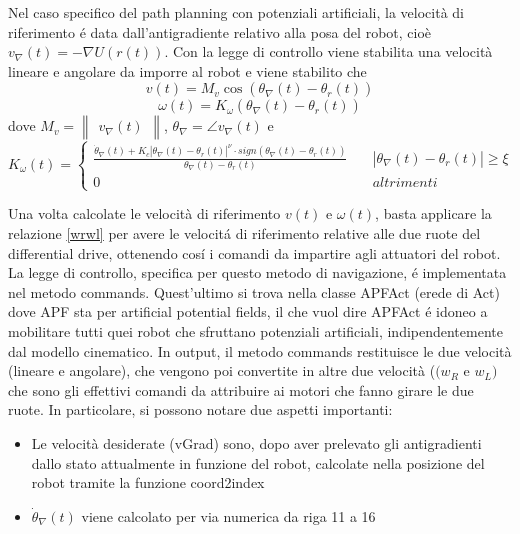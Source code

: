 \documentclass[14pt,a4paper]{extarticle}
\begin{document}
Nel caso specifico del path planning con potenziali artificiali, la velocità di riferimento é data dall'antigradiente relativo alla posa del robot, cioè \(v_\nabla(t) = -\nabla U(r(t))\). Con la legge di controllo viene stabilita una velocità lineare e angolare da imporre al robot e viene stabilito che
\begin{equation}
v(t) = M_v \cos(\theta_{\nabla}(t) - \theta_r(t))
\end{equation} 
\begin{equation}
\omega(t) = K_{\omega}(\theta_{\nabla}(t) - \theta_r(t))
\end{equation} dove \(M_v=\begin{Vmatrix}v_{\nabla}(t)\end{Vmatrix}\), \(\theta_{\nabla}=\angle v_{\nabla}(t)\) e 
\[K_{\omega}(t)= \begin{cases}
\frac{\dot{\theta}_{\nabla}(t) + K_c|\theta_{\nabla}(t)-\theta_r(t)|^{\nu} \cdot sign(\theta_{\nabla}(t) - \theta_r(t))}{\theta_{\nabla}(t) - \theta_r(t)} \quad &|\theta_{\nabla}(t)-\theta_r(t)| \geq \xi \\
0 \quad &altrimenti
\end{cases}\]

Una volta calcolate le velocità di riferimento \(v(t)\) e \(\omega(t)\), basta applicare la relazione \ref{wrwl} per avere le velocitá di riferimento relative alle due ruote del differential drive, ottenendo cosí i comandi da impartire agli attuatori del robot.\\
La legge di controllo, specifica per questo metodo di navigazione, é implementata nel metodo commands. Quest'ultimo si trova nella classe APFAct (erede di Act) dove APF sta per artificial potential fields, il che vuol dire APFAct é idoneo a mobilitare tutti quei robot che sfruttano potenziali artificiali, indipendentemente dal modello cinematico. In output, il metodo commands restituisce le due velocità (lineare e angolare), che vengono poi convertite in altre due velocità (\((w_R\) e \(w_L)\) che sono gli effettivi comandi da attribuire ai motori che fanno girare le due ruote. In particolare, si possono notare due aspetti importanti:
\begin{itemize}
\item Le velocità desiderate (vGrad) sono, dopo aver prelevato gli antigradienti dallo stato attualmente in funzione del robot, calcolate nella posizione del robot tramite la funzione coord2index
\item \(\dot{\theta}_{\nabla}(t)\) viene calcolato per via numerica da riga 11 a 16
\end{itemize}
\end{document}

